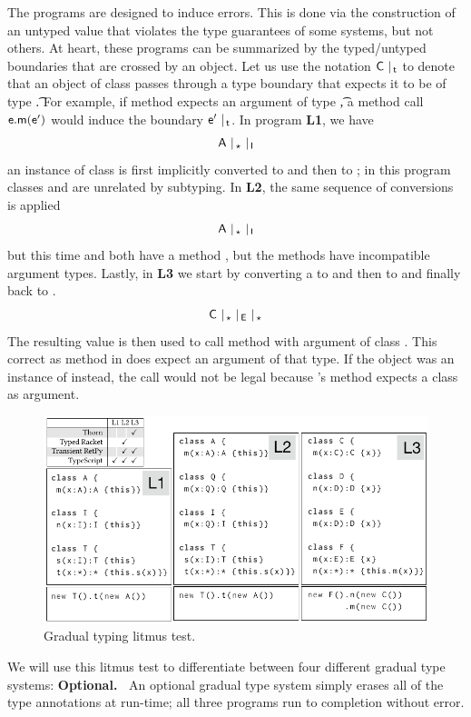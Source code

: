\documentclass[USenglish]{tex/lipics-v2016}f
\begin{document}
The programs are designed to induce errors.  This is done via the
construction of an untyped value that violates the type guarantees of some
systems, but not others.  At heart, these programs can be summarized by the
typed/untyped boundaries that are crossed by an object. Let us use the
notation $\C ~\vert_{\,\t}$ to denote that an object of class \C passes
through a type boundary that expects it to be of type \t. For example,
if method \m expects an argument of type \t, a method call $\e.\m(\ep)$ would
induce the boundary $\ep ~\vert_{\,\t}$. 
In program {\bf L1}, we have \[{\sf{A}} ~\vert_{\,\star} ~ \vert_{\,{\sf{I}}}\] an instance of 
class \A is first implicitly converted to \any and then to \I; in this program
classes \A and \I are unrelated by subtyping. In {\bf L2}, the same sequence
of conversions is applied
\[{\sf{A}}~ \vert_{\,\star} ~ \vert_{\,{\sf{I}}}\] but this time \A and \I both have a
method \m, but the methods have incompatible argument types.  Lastly, in
{\bf L3} we start by converting a \C to \any and then to \E
and finally back to \any.
\[\C~ \vert_{\,\any}~\vert_{\,\E}~\vert_{\,\any}\]
The resulting value is then used to call  method \m with argument of class \C.
This correct as method \m in \C does expect an
argument of that type. If the object was an instance of \E instead, the call
would not be legal because \E's method \m expects a class \D as argument.

\begin{figure}[!h] \includegraphics[width=.95\columnwidth]{../figures/litm}
  \caption{Gradual typing litmus test.}\label{litmus}
\end{figure}

\noindent We will use this litmus test to differentiate between four different
gradual type systems:
\vspace{2mm}\noindent
{\bf Optional.~} An optional gradual type system simply erases all of the
type annotations at run-time; all three programs run to completion without
error.
\end{document}
